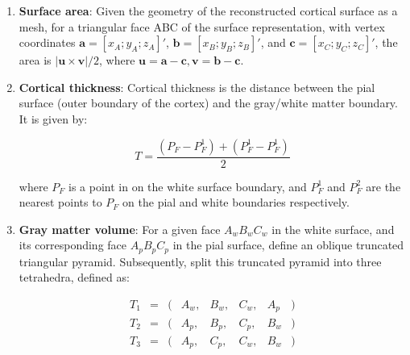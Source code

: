 \documentclass{cys}
\begin{document}
\begin{enumerate}


\item \textbf{Surface area}: Given the geometry of the reconstructed cortical surface as a mesh, for a triangular face ABC of the surface representation, with vertex coordinates $\mathbf{a}=[x_A ; y_A ; z_A]'$, $\mathbf{b}=[x_B ; y_B ; z_B]'$, and $\mathbf{c}=[x_C ; y_C ; z_C]'$, the area is $|\mathbf{u} \times \mathbf{v}|/2$, where $\mathbf{u} = \mathbf{a}-\mathbf{c}, \mathbf{v} = \mathbf{b}-\mathbf{c}$.
\\
\item \textbf{Cortical thickness}: Cortical thickness is the distance between the pial surface (outer boundary of the cortex) and the gray/white matter boundary. It is given by: 

\begin{equation}
T=\frac{(P_F-P_F^1)+(P_F^1-P_F^1)}{2}
\end{equation}

where $P_F$ is a point in on the white surface boundary, and $P_F^1$ and $P_F^2$ are the nearest points to $P_F$ on the pial and white boundaries respectively. 
\\
\item \textbf{Gray matter volume}: For a given face $A_w B_w C_w$ in the white surface, and its corresponding face $A_p B_p C_p$ in the pial surface, define an oblique truncated triangular pyramid. Subsequently, split this truncated pyramid into three tetrahedra, defined as:

\[
\begin{array}{lcllllll} 
T_1 &=& (&A_w,&B_w,&C_w,&A_p&)\\ 
T_2 &=& (&A_p,&B_p,&C_p,&B_w&)\\ 
T_3 &=& (&A_p,&C_p,&C_w,&B_w&)
\end{array}
\]


\end{enumerate}
\end{document}
